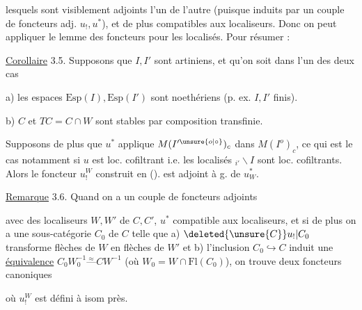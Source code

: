 lesquels sont visiblement adjoints l'un
de l'autre (puisque induits par un
couple de foncteurs adj. $u_!,u^*$), et
de plus compatibles aux localiseurs.
Donc on peut appliquer le lemme des
foncteurs  pour les localisés. Pour
résumer :

\uline{Corollaire} 3.5. Supposons que $I,I'$ sont
 artiniens, et qu'on soit dans l'un
des deux cas 

a)  les espaces $\mathrm{Esp}(I),\mathrm{Esp}(I')$
sont noethériens (p. ex. $I,I'$ finis).

b) $C$ et $TC=C\cap W$ sont stables par composition
transfinie.

Supposons de plus que $u^*$ applique $M(I'^{\unsure{o|\circ}})_c$
dans $M(I^o)_c$, ce qui est le cas notamment
si $u$ est loc.  cofiltrant i.e. les
 localisés $\mathord{}_{i'}\backslash I$ sont loc. cofiltrants. 
Alors le foncteur $u_!^W$ construit en ().
est adjoint à g. de $u_W^*$.

\uline{Remarque} 3.6. Quand on a un couple
de foncteurs adjoints


avec des localiseurs $W,W'$ de $C,C'$,
$u^*$ compatible aux localiseurs, et si de
plus on a une sous-catégorie  $C_0$ de $C$
telle que a) $\deleted{\unsure{C}}u_!|C_0$ transforme flèches
de $W$ en flèches de $W'$ et b) l'inclusion
$C_0\hookrightarrow C$ induit une \uline{équivalence}
$C_0W_0^{-1}\overset{\approx}{\text{---}}CW^{-1}$ (où $W_0=W\cap\mathrm{Fl}(C_0)$),
on trouve deux foncteurs canoniques


où $u_!^W$ est défini  à isom  près.

